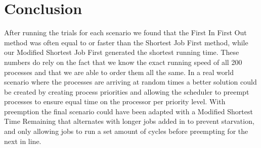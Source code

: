 \documentclass[12pt]{article}
\begin{document}
\section{Conclusion}

After running the trials for each scenario we found that the First In First Out method was often equal to or faster than the Shortest Job First method, while our Modified Shortest Job First generated the shortest running time. These numbers do rely on the fact that we know the exact running speed of all 200 processes and that we are able to order them all the same. In a real world scenario where the processes are arriving at random times a better solution could be created by creating process priorities and allowing the scheduler to preempt processes to ensure equal time on the processor per priority level. With preemption the final scenario could have been adapted with a Modified Shortest Time Remaining that alternates with longer jobs added in to prevent starvation, and only allowing jobs to run a set amount of cycles before preempting for the next in line. 

\newpage
\begin{appendix}
  \listoffigures
  \listoftables
\end{appendix}
\end{document}
